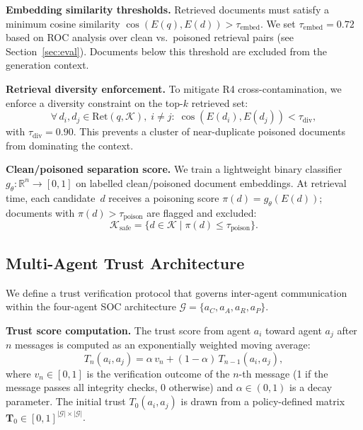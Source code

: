 \documentclass[journal,twoside]{IEEEtran}
\begin{document}
\textbf{Embedding similarity thresholds.}
Retrieved documents must satisfy a minimum cosine similarity
$\cos(E(q), E(d)) > \tau_{\text{embed}}$.  We set
$\tau_{\text{embed}} = 0.72$ based on ROC analysis over
clean vs.\ poisoned retrieval pairs (see Section~\ref{sec:eval}).
Documents below this threshold are excluded from the generation context.

\textbf{Retrieval diversity enforcement.}
To mitigate R4 cross-contamination, we enforce a diversity constraint
on the top-$k$ retrieved set:
\begin{equation}
  \forall\, d_i, d_j \in \text{Ret}(q, \mathcal{K}),\;
  i \neq j\!:\; \cos(E(d_i), E(d_j)) < \tau_{\text{div}},
  \label{eq:diversity}
\end{equation}
with $\tau_{\text{div}} = 0.90$.  This prevents a cluster of
near-duplicate poisoned documents from dominating the context.

\textbf{Clean/poisoned separation score.}
We train a lightweight binary classifier
$g_{\theta}\!: \mathbb{R}^{n} \to [0,1]$ on labelled
clean/poisoned document embeddings.  At retrieval time, each
candidate~$d$ receives a poisoning score
$\pi(d) = g_{\theta}(E(d))$; documents with
$\pi(d) > \tau_{\text{poison}}$ are flagged and excluded:
\begin{equation}
  \mathcal{K}_{\text{safe}} = \{d \in \mathcal{K} \mid \pi(d) \le \tau_{\text{poison}}\}.
\end{equation}

\subsection{Multi-Agent Trust Architecture}
\label{sec:defense:trust}

We define a trust verification protocol that governs inter-agent
communication within the four-agent SOC architecture
$\mathcal{G} = \{a_C, a_A, a_R, a_P\}$.

\textbf{Trust score computation.}
The trust score from agent $a_i$ toward agent $a_j$ after $n$
messages is computed as an exponentially weighted moving average:
\begin{equation}
  T_n(a_i, a_j) = \alpha\, v_n + (1 - \alpha)\, T_{n-1}(a_i, a_j),
  \label{eq:trust}
\end{equation}
where $v_n \in [0,1]$ is the verification outcome of the $n$-th
message (1 if the message passes all integrity checks, 0 otherwise)
and $\alpha \in (0,1)$ is a decay parameter.  The initial trust
$T_0(a_i, a_j)$ is drawn from a policy-defined matrix
$\mathbf{T}_0 \in [0,1]^{|\mathcal{G}| \times |\mathcal{G}|}$.
\end{document}
